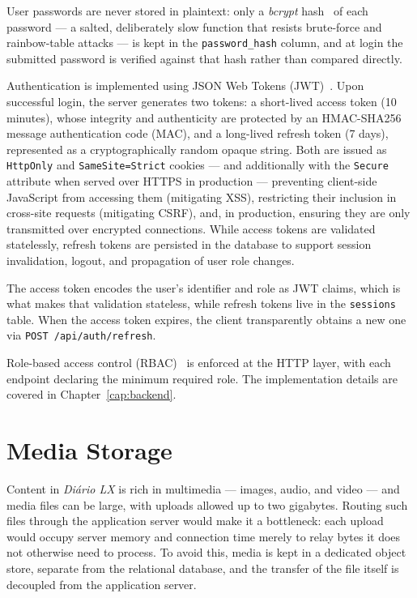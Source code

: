 User passwords are never stored in plaintext: only a \emph{bcrypt} hash~\cite{provos1999bcrypt} of each password
--- a salted, deliberately slow function that resists brute-force and rainbow-table
attacks --- is kept in the \texttt{password\_hash} column, and at login the submitted
password is verified against that hash rather than compared directly.

Authentication is implemented using JSON Web Tokens (JWT)~\cite{jwt_spec}. Upon
successful login, the server generates two tokens: a short-lived access token
(10 minutes), whose integrity and authenticity are protected by an HMAC-SHA256
message authentication code (MAC), and a long-lived refresh token (7 days),
represented as a cryptographically random opaque string. Both are issued as
\texttt{HttpOnly} and \texttt{SameSite=Strict} cookies --- and additionally with the
\texttt{Secure} attribute when served over HTTPS in production --- preventing
client-side JavaScript from accessing them (mitigating XSS), restricting their
inclusion in cross-site requests (mitigating CSRF), and, in production, ensuring
they are only transmitted over encrypted connections. While access tokens are validated statelessly,
refresh tokens are persisted in the database to support session invalidation,
logout, and propagation of user role changes.

The access token encodes the user's identifier and role as JWT claims, which is what
makes that validation stateless, while refresh tokens live in the \texttt{sessions}
table. When the access token expires, the client transparently obtains a new one via
\texttt{POST /api/auth/refresh}.

Role-based access control (RBAC)~\cite{sandhu1996rbac} is enforced at the HTTP layer, with each endpoint
declaring the minimum required role. The implementation details are covered in
Chapter~\ref{cap:backend}.

\section{Media Storage} \label{sec:arch_media}

Content in \textit{Diário LX} is rich in multimedia --- images, audio, and video --- and
media files can be large, with uploads allowed up to two gigabytes. Routing such
files through the application server would make it a bottleneck: each upload would
occupy server memory and connection time merely to relay bytes it does not otherwise
need to process. To avoid this, media is kept in a dedicated object store, separate
from the relational database, and the transfer of the file itself is decoupled from the
application server.

